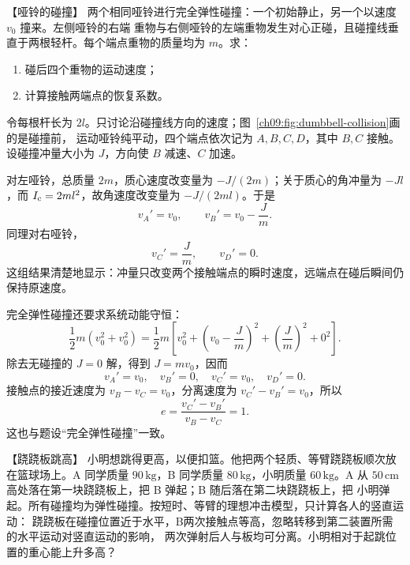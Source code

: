 {
\begin{origexamplebox}{【哑铃的碰撞】}\label{ch09:ex:s16-14-6}
两个相同哑铃进行完全弹性碰撞：一个初始静止，另一个以速度 $v_0$ 撞来。左侧哑铃的右端
重物与右侧哑铃的左端重物发生对心正碰，且碰撞线垂直于两根轻杆。每个端点重物的质量均为
$m$。求：
\begin{enumerate}[label=(\arabic*),leftmargin=2.2em]
  \item 碰后四个重物的运动速度；
  \item 计算接触两端点的恢复系数。
\end{enumerate}


\ThQDumbbells
\end{origexamplebox}

\begin{xesolution}
\dumbbellCollisionDiagram

令每根杆长为 $2l$。只讨论沿碰撞线方向的速度；图~\ref{ch09:fig:dumbbell-collision}画的是碰撞前，
运动哑铃纯平动，四个端点依次记为
$A,B,C,D$，其中 $B,C$ 接触。设碰撞冲量大小为 $J$，方向使 $B$ 减速、$C$ 加速。

对左哑铃，总质量 $2m$，质心速度改变量为 $-J/(2m)$；关于质心的角冲量为 $-Jl$，而
$I_{\rm c}=2ml^2$，故角速度改变量为 $-J/(2ml)$。于是
\[
 v_A'=v_0,\qquad v_B'=v_0-\frac{J}{m}.
\]
同理对右哑铃，
\[
 v_C'=\frac{J}{m},\qquad v_D'=0.
\]
这组结果清楚地显示：冲量只改变两个接触端点的瞬时速度，远端点在碰后瞬间仍保持原速度。

完全弹性碰撞还要求系统动能守恒：
\[
 \frac12m(v_0^2+v_0^2)
 =\frac12m\left[v_0^2+\left(v_0-\frac Jm\right)^2
 +\left(\frac Jm\right)^2+0^2\right].
\]
除去无碰撞的 $J=0$ 解，得到 $J=mv_0$，因而
\[
 \boxed{v_A'=v_0,\quad v_B'=0,\quad v_C'=v_0,\quad v_D'=0}.
\]
接触点的接近速度为 $v_B-v_C=v_0$，分离速度为 $v_C'-v_B'=v_0$，所以
\[
 \boxed{e=\frac{v_C'-v_B'}{v_B-v_C}=1}.
\]
这也与题设“完全弹性碰撞”一致。
\end{xesolution}

\begin{origexamplebox}{【跷跷板跳高】}\label{ch09:ex:s16-14-7}
小明想跳得更高，以便扣篮。他把两个轻质、等臂跷跷板顺次放在篮球场上。A 同学质量
$90\,\mathrm{kg}$，B 同学质量 $80\,\mathrm{kg}$，小明质量 $60\,\mathrm{kg}$。A 从
$50\,\mathrm{cm}$ 高处落在第一块跷跷板上，把 B 弹起；B 随后落在第二块跷跷板上，把
小明弹起。所有碰撞均为弹性碰撞。按短时、等臂的理想冲击模型，只计算各人的竖直运动：
跷跷板在碰撞位置近于水平，B两次接触点等高，忽略转移到第二装置所需的水平运动对竖直运动的影响，
两次弹射后人与板均可分离。小明相对于起跳位置的重心能上升多高？



\end{origexamplebox}}
